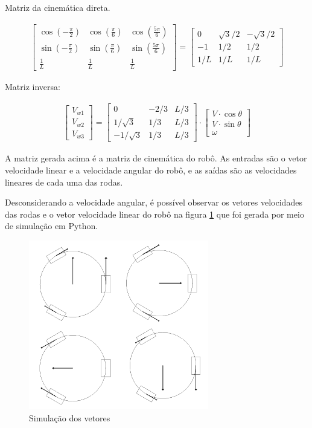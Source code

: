 Matriz da cinemática direta.

\begin{gather}
	\begin{bmatrix}
		\cos{\left(-\frac{\pi}{2}\right)} & \cos{\left(\frac{\pi}{6}\right)} & \cos{\left(\frac{5\pi}{6}\right)} \\
		\sin{\left(-\frac{\pi}{2}\right)} & \sin{\left(\frac{\pi}{6}\right)} & \sin{\left(\frac{5\pi}{6}\right)} \\
		\frac{1}{L} & \frac{1}{L} & \frac{1}{L}
	\end{bmatrix}
	=
	\begin{bmatrix}
		0 & \sqrt{3}/2 & -\sqrt{3}/2 \\
		-1 & 1/2 & 1/2  \\
		1/L & 1/L & 1/L
	\end{bmatrix}
\end{gather}



Matriz inversa:


\begin{gather}
	\begin{bmatrix} V_{w1} \\  V_{w2} \\  V_{w3} \end{bmatrix}
	=
	\begin{bmatrix}
		0 & -2/3 & L/3 \\
		1/\sqrt{3} & 1/3 & L/3\\
		-1/\sqrt{3} & 1/3 & L/3
	\end{bmatrix}
	\cdot
	\begin{bmatrix} V\cdot \cos{\theta} \\  V\cdot \sin{\theta} \\  \omega \end{bmatrix}
\end{gather}


A matriz gerada acima é a matriz de cinemática do robô.
As entradas são o vetor velocidade linear e a velocidade angular do robô, e as
saídas são as velocidades lineares de cada uma das rodas.

Desconsiderando a velocidade angular, é possível observar os vetores velocidades
 das rodas e o vetor velocidade linear do robô na figura \ref{simulacao} que foi
 gerada por meio de simulação em Python.

\begin{figure}[h]
	\centering
	\includegraphics[width=0.7\textwidth]{figures/simulacao}
	\caption{Simulação dos vetores}
	\label{simulacao}
\end{figure}